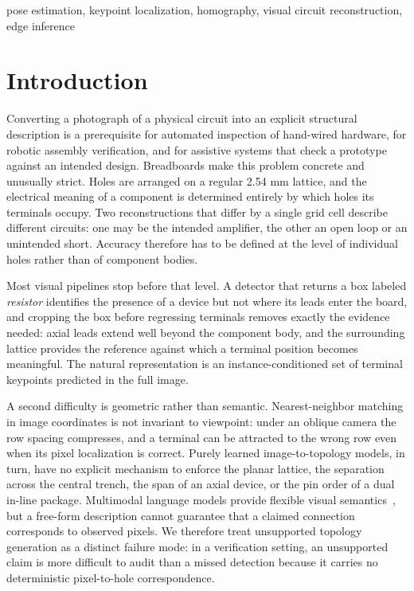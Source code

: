 \documentclass[conference]{IEEEtran}
\begin{document}
\begin{IEEEkeywords}
pose estimation, keypoint localization, homography, visual circuit
reconstruction, edge inference
\end{IEEEkeywords}

\section{Introduction}

Converting a photograph of a physical circuit into an explicit structural
description is a prerequisite for automated inspection of hand-wired hardware,
for robotic assembly verification, and for assistive systems that check a
prototype against an intended design. Breadboards make this problem concrete
and unusually strict. Holes are arranged on a regular 2.54 mm lattice, and the
electrical meaning of a component is determined entirely by which holes its
terminals occupy. Two reconstructions that differ by a single grid cell describe
different circuits: one may be the intended amplifier, the other an open loop or
an unintended short. Accuracy therefore has to be defined at the level of
individual holes rather than of component bodies.

Most visual pipelines stop before that level. A detector that returns a box
labeled \emph{resistor} identifies the presence of a device but not where its
leads enter the board, and cropping the box before regressing terminals removes
exactly the evidence needed: axial leads extend well beyond the component body,
and the surrounding lattice provides the reference against which a terminal
position becomes meaningful. The natural representation is an
instance-conditioned set of terminal keypoints predicted in the full image.

A second difficulty is geometric rather than semantic. Nearest-neighbor
matching in image coordinates is not invariant to viewpoint: under an oblique
camera the row spacing compresses, and a terminal can be attracted to the wrong
row even when its pixel localization is correct. Purely learned image-to-topology
models, in turn, have no explicit mechanism to enforce the planar lattice, the
separation across the central trench, the span of an axial device, or the pin
order of a dual in-line package. Multimodal language models provide flexible
visual semantics~\cite{llava}, but a free-form description cannot guarantee that
a claimed connection corresponds to observed pixels. We therefore treat
unsupported topology generation as a distinct failure mode: in a verification
setting, an unsupported claim is more difficult to audit than a missed
detection because it carries no deterministic pixel-to-hole correspondence.
\end{document}
